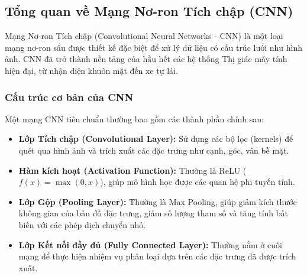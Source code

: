 \subsection{Tổng quan về Mạng Nơ-ron Tích chập (CNN)}
Mạng Nơ-ron Tích chập (Convolutional Neural Networks - CNN) là một loại mạng nơ-ron sâu được thiết kế đặc biệt để xử lý dữ liệu có cấu trúc lưới như hình ảnh. CNN đã trở thành nền tảng của hầu hết các hệ thống Thị giác máy tính hiện đại, từ nhận diện khuôn mặt đến xe tự lái.

\subsubsection{Cấu trúc cơ bản của CNN}
Một mạng CNN tiêu chuẩn thường bao gồm các thành phần chính sau:
\begin{itemize}
    \item \textbf{Lớp Tích chập (Convolutional Layer):} Sử dụng các bộ lọc (kernels) để quét qua hình ảnh và trích xuất các đặc trưng như cạnh, góc, vân bề mặt.
    \item \textbf{Hàm kích hoạt (Activation Function):} Thường là ReLU ($f(x) = \max(0, x)$), giúp mô hình học được các quan hệ phi tuyến tính.
    \item \textbf{Lớp Gộp (Pooling Layer):} Thường là Max Pooling, giúp giảm kích thước không gian của bản đồ đặc trưng, giảm số lượng tham số và tăng tính bất biến với các phép dịch chuyển nhỏ.
    \item \textbf{Lớp Kết nối đầy đủ (Fully Connected Layer):} Thường nằm ở cuối mạng để thực hiện nhiệm vụ phân loại dựa trên các đặc trưng đã được trích xuất.
\end{itemize}

